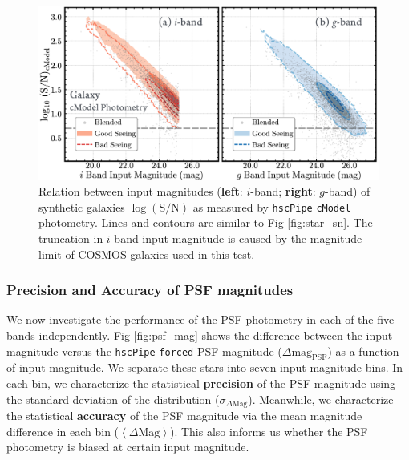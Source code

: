 \documentclass[useamsfonts]{pasj01}
\def\hscpipe{\texttt{hscPipe}}
\def\cmodel{\texttt{cModel}}
\def\forced{\texttt{forced}}
\newcommand{\smag}{$\sigma_{\Delta\mathrm{Mag}}$}
\newcommand{\mmag}{$\left<{\Delta\mathrm{Mag}}\right>$}
\begin{document}
\begin{figure}
    \begin{center}
        \includegraphics[width=\textwidth]{fig/synpipe_galaxy_sn}
    \end{center}
    \caption{
        Relation between input magnitudes (\textbf{left}: $i$-band; \textbf{right}:
        $g$-band) of synthetic galaxies $\log (\mathrm{S}/\mathrm{N})$ as measured 
        by \hscpipe{} \cmodel{} photometry. 
        Lines and contours are similar to Fig \ref{fig:star_sn}.
        The truncation in $i$ band input magnitude is caused by the magnitude limit 
        of COSMOS galaxies used in this test. 
        }
    \label{fig:cmodel_sn}
\end{figure}


\subsubsection{Precision and Accuracy of PSF magnitudes}

    We now investigate the performance of the PSF photometry in each of the five bands
    independently. 
    Fig \ref{fig:psf_mag} shows the difference between the input magnitude versus the
    \hscpipe{} \forced{} PSF magnitude ($\Delta \mathrm{mag}_{\mathrm{PSF}}$) as a 
    function of input magnitude. 
    We separate these stars into seven input magnitude bins.  
    In each bin, we characterize the statistical \textbf{precision} of the PSF 
    magnitude using the standard deviation of the distribution (\smag{}).
    Meanwhile, we characterize the statistical \textbf{accuracy} of the PSF magnitude 
    via the mean magnitude difference in each bin (\mmag{}). 
    This also informs us whether the PSF photometry is biased at certain input 
    magnitude.
    
\end{document}
